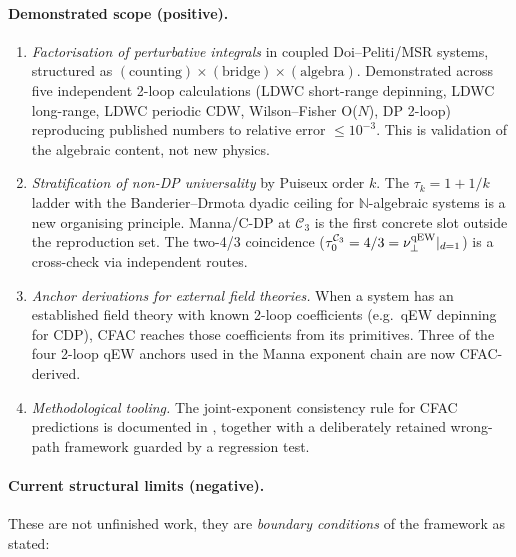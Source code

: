 \documentclass[11pt,a4paper]{article}
\theoremstyle{plain}
\theoremstyle{definition}
\begin{document}
\paragraph{Demonstrated scope (positive).}
\begin{enumerate}[label=(\roman*),leftmargin=1.4em,itemsep=1pt]
  \item \emph{Factorisation of perturbative integrals} in coupled
    Doi--Peliti/MSR systems, structured as
    $(\text{counting})\times(\text{bridge})\times(\text{algebra})$.
    Demonstrated across five independent 2-loop calculations
    (LDWC short-range depinning, LDWC long-range, LDWC periodic
    CDW, Wilson--Fisher O($N$), DP 2-loop) reproducing published
    numbers to relative error $\leq 10^{-3}$.  This is validation
    of the algebraic content, not new physics.
  \item \emph{Stratification of non-DP universality} by Puiseux
    order $k$.  The $\tau_k = 1 + 1/k$ ladder with the
    Banderier--Drmota dyadic ceiling for $\mathbb{N}$-algebraic
    systems is a new organising principle.  Manna/C-DP at
    $\mathcal{C}_3$ is the first concrete slot outside the
    reproduction set.  The two-4/3 coincidence
    ($\tau_0^{\mathcal{C}_3} = 4/3 = \nu_\perp^{\rm qEW}|_{d=1}$)
    is a cross-check via independent routes.
  \item \emph{Anchor derivations for external field theories.}
    When a system has an established field theory with known
    2-loop coefficients (e.g.\ qEW depinning for CDP), CFAC
    reaches those coefficients from its primitives.  Three of
    the four 2-loop qEW anchors used in the Manna exponent
    chain are now CFAC-derived.
  \item \emph{Methodological tooling.}  The joint-exponent
    consistency rule for CFAC predictions is documented in
    \citep{AmarteifioManna2026}, together with a deliberately
    retained wrong-path framework guarded by a regression test.
\end{enumerate}

\paragraph{Current structural limits (negative).}
These are not unfinished work, they are \emph{boundary
conditions} of the framework as stated:
\end{document}
